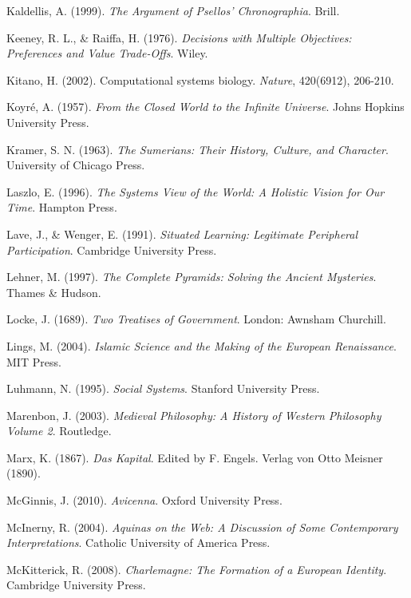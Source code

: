 \documentclass[twocolumn]{article}
\begin{document}
\begin{thebibliography}{99}
Kaldellis, A. (1999). \textit{The Argument of Psellos' Chronographia}. Brill.

Keeney, R. L., \& Raiffa, H. (1976). \textit{Decisions with Multiple Objectives: Preferences and Value Trade-Offs}. Wiley.

Kitano, H. (2002). Computational systems biology. \textit{Nature}, 420(6912), 206-210.

Koyré, A. (1957). \textit{From the Closed World to the Infinite Universe}. Johns Hopkins University Press.

Kramer, S. N. (1963). \textit{The Sumerians: Their History, Culture, and Character}. University of Chicago Press.

Laszlo, E. (1996). \textit{The Systems View of the World: A Holistic Vision for Our Time}. Hampton Press.

Lave, J., \& Wenger, E. (1991). \textit{Situated Learning: Legitimate Peripheral Participation}. Cambridge University Press.

Lehner, M. (1997). \textit{The Complete Pyramids: Solving the Ancient Mysteries}. Thames \& Hudson.

Locke, J. (1689). \textit{Two Treatises of Government}. London: Awnsham Churchill.

Lings, M. (2004). \textit{Islamic Science and the Making of the European Renaissance}. MIT Press.

Luhmann, N. (1995). \textit{Social Systems}. Stanford University Press.

Marenbon, J. (2003). \textit{Medieval Philosophy: A History of Western Philosophy Volume 2}. Routledge.

Marx, K. (1867). \textit{Das Kapital}. Edited by F. Engels. Verlag von Otto Meisner (1890).

McGinnis, J. (2010). \textit{Avicenna}. Oxford University Press.

McInerny, R. (2004). \textit{Aquinas on the Web: A Discussion of Some Contemporary Interpretations}. Catholic University of America Press.

McKitterick, R. (2008). \textit{Charlemagne: The Formation of a European Identity}. Cambridge University Press.


\end{thebibliography}
\end{document}
